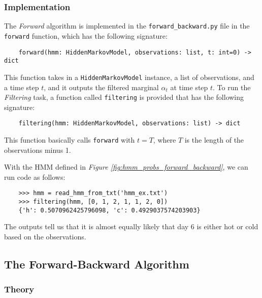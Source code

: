 \documentclass{article}
\theoremstyle{definition}
\begin{document}
\subsubsection{Implementation}

The \textit{Forward} algorithm is implemented in the \texttt{forward\_backward.py} file in the \texttt{forward} function, which has the following signature:

\begin{verbatim}
    forward(hmm: HiddenMarkovModel, observations: list, t: int=0) -> dict
\end{verbatim}

This function takes in a \texttt{HiddenMarkovModel} instance, a list of observations, and a time step \(t\), and it outputs the filtered marginal \(\alpha_t\) at time step \(t\). To run the \textit{Filtering} task, a function called \texttt{filtering} is provided that has the following signature:

\begin{verbatim}
    filtering(hmm: HiddenMarkovModel, observations: list) -> dict
\end{verbatim}

This function basically calls \texttt{forward} with \(t = T\), where \(T\) is the length of the observations minus 1.

With the HMM defined in \textit{Figure \ref{fig:hmm_probs_forward_backward}}, we can run code as follows:

\begin{verbatim}
    >>> hmm = read_hmm_from_txt('hmm_ex.txt')
    >>> filtering(hmm, [0, 1, 2, 1, 1, 2, 0])
    {'h': 0.5070962425796098, 'c': 0.4929037574203903}
\end{verbatim}

The outputs tell us that it is almost equally likely that day 6 is either hot or cold based on the observations.

\subsection{The Forward-Backward Algorithm} \label{sec:forward_backward_algorithm}

\subsubsection{Theory}
\end{document}
